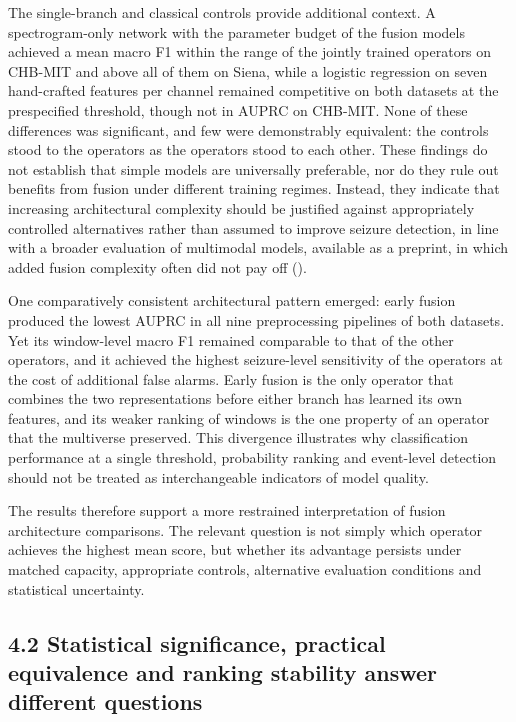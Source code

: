 \documentclass[11pt,a4paper]{article}
\begin{document}
The single-branch and classical controls provide additional context. A spectrogram-only
network with the parameter budget of the fusion models achieved a mean macro F1 within
the range of the jointly trained operators on CHB-MIT and above all of them on Siena,
while a logistic regression on seven hand-crafted features per channel remained
competitive on both datasets at the prespecified threshold, though not in AUPRC on
CHB-MIT. None of these differences was significant, and few were demonstrably
equivalent: the controls stood to the operators as the operators stood to each other.
These findings do not establish that simple models are universally preferable, nor do
they rule out benefits from fusion under different training regimes. Instead, they
indicate that increasing architectural complexity should be justified against
appropriately controlled alternatives rather than assumed to improve seizure detection,
in line with a broader evaluation of multimodal models, available as a preprint, in
which added fusion complexity often did not pay off (\citealp{Rheude_2025}).

One comparatively consistent architectural pattern emerged: early fusion produced the
lowest AUPRC in all nine preprocessing pipelines of both datasets. Yet its window-level
macro F1 remained comparable to that of the other operators, and it achieved the highest
seizure-level sensitivity of the operators at the cost of additional false alarms. Early
fusion is the only operator that combines the two representations before either branch
has learned its own features, and its weaker ranking of windows is the one property of
an operator that the multiverse preserved. This divergence illustrates why
classification performance at a single threshold, probability ranking and event-level
detection should not be treated as interchangeable indicators of model quality.

The results therefore support a more restrained interpretation of fusion architecture
comparisons. The relevant question is not simply which operator achieves the highest
mean score, but whether its advantage persists under matched capacity, appropriate
controls, alternative evaluation conditions and statistical uncertainty.

\subsection{4.2 Statistical significance, practical equivalence and ranking stability answer different questions}\label{statistical-significance-practical-equivalence-and-ranking-stability-answer-different-questions}
\end{document}
